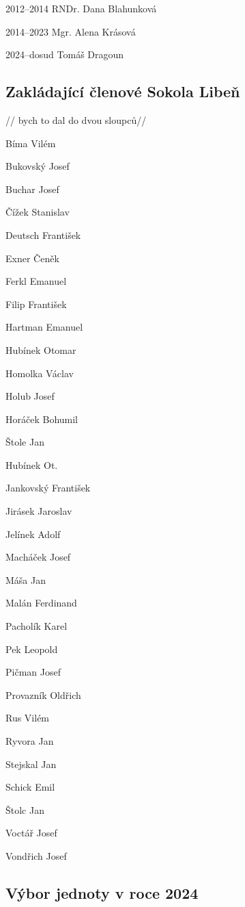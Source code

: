 2012--2014 RNDr. Dana Blahunková

2014--2023 Mgr. Alena Krásová

2024--dosud Tomáš Dragoun

\subsection{\texorpdfstring{Zakládající členové Sokola Libeň
}{Zakládající členové Sokola Libeň }}\label{zakluxe1dajuxedcuxed-ux10dlenovuxe9-sokola-libeux148}

// bych to dal do dvou sloupců//

Bíma Vilém

Bukovský Josef

Buchar Josef

Čížek Stanislav

Deutsch František

Exner Čeněk

Ferkl Emanuel

Filip František

Hartman Emanuel

Hubínek Otomar

Homolka Václav

Holub Josef

Horáček Bohumil

Štole Jan

Hubínek Ot.

Jankovský František

Jirásek Jaroslav

Jelínek Adolf

Macháček Josef

Máša Jan

Malán Ferdinand

Pacholík Karel

Pek Leopold

Pičman Josef

Provazník Oldřich

Rus Vilém

Ryvora Jan

Stejskal Jan

Schick Emil

Štolc Jan

Voctář Josef

Vondřich Josef

\subsection{Výbor jednoty v roce
2024}\label{vuxfdbor-jednoty-v-roce-2024}


